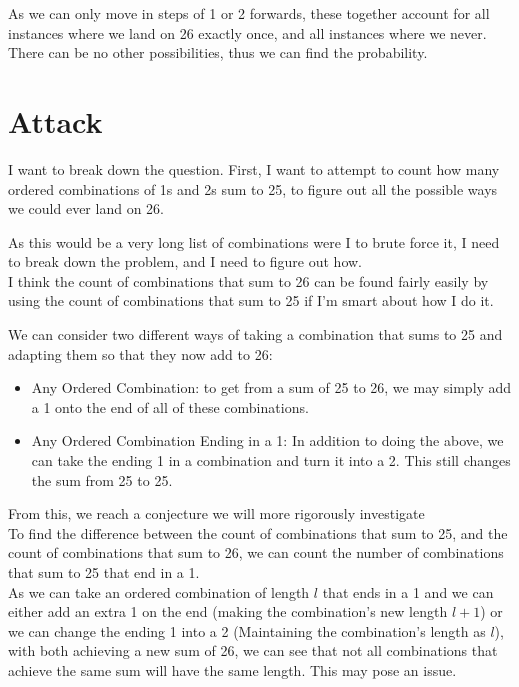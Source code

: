\documentclass[11pt]{article}
\newcommand{\keywordfont}{\textsc}
\newcommand{\keyword}[1]{%
  \marginpar{\raggedright\small\keywordfont{#1}}}
\begin{document}
As  we can only move in steps of 1 or 2\keyword{Justify} forwards, these together account for all instances where we land on 26 exactly once, and all instances where we never. There can be no other possibilities, thus we can find the probability.


\section{Attack}
I want to break down the question. First, I want to attempt to count how many ordered combinations of 1s and 2s sum to 25, to figure out all the possible ways we could ever land on 26. 

As this would be a very long list of combinations were I to brute force it, I need to break down the problem, and I need to figure out how.\\

I think the count of combinations that sum to 26 \keyword{Maybe} can be found fairly easily by using the count of combinations that sum to 25 if I’m smart about how I do it.


We can consider two different ways of taking a \keyword{Justify} combination that sums to 25 and adapting them so that they now add to 26:

\begin{itemize}
\item Any Ordered Combination: to get from a sum of 25 to 26, we may simply add a 1 onto the end of all of these combinations.
\item Any Ordered Combination Ending in a 1: In addition to doing the above, we can take the ending 1 in a combination and turn it into a 2. This still changes the sum from 25 to 25.
\end{itemize}

From this, we reach a conjecture we will more rigorously investigate\\

To find the difference between \keyword{Conjecture 1} the count of combinations that sum to 25, and the count of combinations that sum to 26, we can count the number of combinations that sum to 25 that end in a 1.\\


As we can take an ordered combination of \keyword{Pause}length $l$ that ends in a 1 and we can either add an extra 1 on the end (making the combination’s new length $l+1$) or we can change the ending 1 into a 2 (Maintaining the combination’s length as $l$), with both achieving a new sum of 26, we can see that not all combinations that achieve the same sum will have the same length. This may pose an issue.\\
\end{document}
